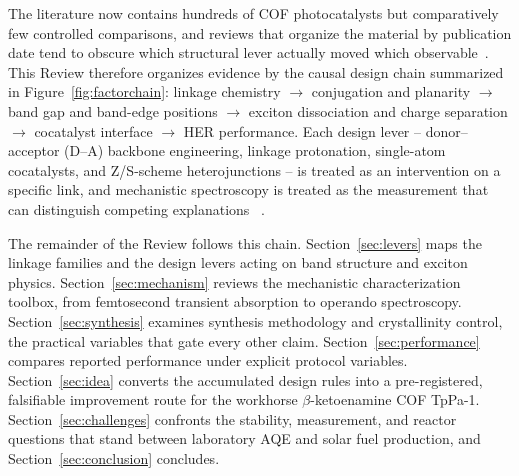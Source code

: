 The literature now contains hundreds of COF photocatalysts but comparatively
few controlled comparisons, and reviews that organize the material by
publication date tend to obscure which structural lever actually moved which
observable~\cite{aslam2026a,you2021recent,yang2020covalent,zhou2023recent}.
This Review therefore organizes evidence by the causal design chain
summarized in Figure~\ref{fig:factorchain}: linkage chemistry $\rightarrow$
conjugation and planarity $\rightarrow$ band gap and band-edge positions
$\rightarrow$ exciton dissociation and charge separation $\rightarrow$
cocatalyst interface $\rightarrow$ HER performance. Each design lever --
donor--acceptor (D--A) backbone engineering, linkage protonation, single-atom
cocatalysts, and Z/S-scheme heterojunctions -- is treated as an intervention
on a specific link, and mechanistic spectroscopy is treated as the
measurement that can distinguish competing explanations
~\cite{ghosh2020identification,choi2024understanding,shen2023efficient}.

The remainder of the Review follows this chain. Section~\ref{sec:levers}
maps the linkage families and the design levers acting on band structure and
exciton physics. Section~\ref{sec:mechanism} reviews the mechanistic
characterization toolbox, from femtosecond transient absorption to operando
spectroscopy. Section~\ref{sec:synthesis} examines synthesis methodology and
crystallinity control, the practical variables that gate every other claim.
Section~\ref{sec:performance} compares reported performance under explicit
protocol variables. Section~\ref{sec:idea} converts the accumulated design
rules into a pre-registered, falsifiable improvement route for the workhorse
$\beta$-ketoenamine COF TpPa-1. Section~\ref{sec:challenges} confronts the
stability, measurement, and reactor questions that stand between
laboratory AQE and solar fuel production, and Section~\ref{sec:conclusion}
concludes.
